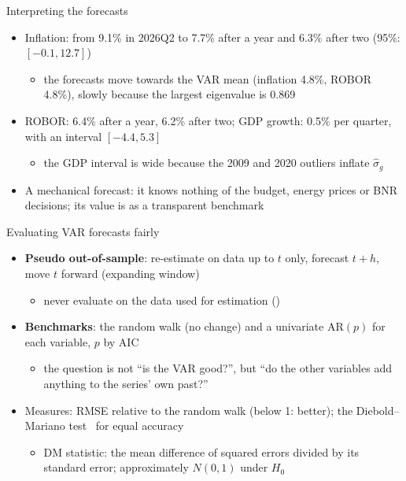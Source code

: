 \begin{frame}{Interpreting the forecasts}
\itemsize{\small}
\begin{itemize}
    \item Inflation: from 9.1\% in 2026Q2 to 7.7\% after a year and 6.3\% after two (95\%: $[-0.1, 12.7]$)
    \begin{itemize}
        \item the forecasts move towards the VAR mean (inflation 4.8\%, ROBOR 4.8\%), slowly because the largest eigenvalue is 0.869
    \end{itemize}
    \item ROBOR: 6.4\% after a year, 6.2\% after two; GDP growth: 0.5\% per quarter, with an interval $[-4.4, 5.3]$
    \begin{itemize}
        \item the GDP interval is wide because the 2009 and 2020 outliers inflate $\hat\sigma_g$
    \end{itemize}
    \item A mechanical forecast: it knows nothing of the budget, energy prices or BNR decisions; its value is as a transparent benchmark
\end{itemize}
\end{frame}

\begin{frame}{Evaluating VAR forecasts fairly}
\itemsize{\small}
\begin{itemize}
    \item \textbf{Pseudo out-of-sample}: re-estimate on data up to $t$ only, forecast $t + h$, move $t$ forward (expanding window)
    \begin{itemize}
        \item never evaluate on the data used for estimation ()
    \end{itemize}
    \item \textbf{Benchmarks}: the random walk (no change) and a univariate AR$(p)$ for each variable, $p$ by AIC
    \begin{itemize}
        \item the question is not ``is the VAR good?'', but ``do the other variables add anything to the series' own past?''
    \end{itemize}
    \item Measures: RMSE relative to the random walk (below 1: better); the Diebold--Mariano test \ for equal accuracy
    \begin{itemize}
        \item DM statistic: the mean difference of squared errors divided by its standard error; approximately $N(0, 1)$ under $H_0$
    \end{itemize}
\end{itemize}
\end{frame}

